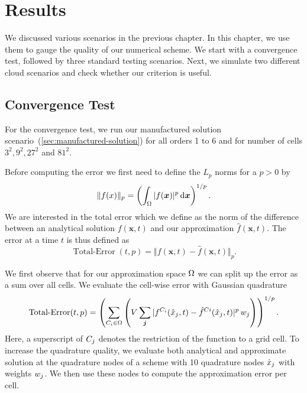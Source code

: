 \chapter{Results}\label{chap:results}
We discussed various scenarios in the previous chapter.
In this chapter, we use them to gauge the quality of our numerical scheme.
We start with a convergence test, followed by three standard testing scenarios.
Next, we simulate two different cloud scenarios and check whether our \amr{} criterion is useful.

\newcommand{\error}{\operatorname{Total-Error}}
\section{Convergence Test}\label{sec:results-convergence}
For the convergence test, we run our manufactured solution scenario~(\cref{sec:manufactured-solution}) for all orders 1 to 6 and for number of cells $3^2, 9^2, 27^2$ and $81^2 $.

Before computing the error we first need to define the $L_p$ norms for a $p > 0$ by
\begin{equation}
  \label{eq:Lp-nrom}
  \Vert f(x) \Vert_p = \left( \intddomain{ \vert f(\bm{x}) \vert^p}  \right)^{1/p}.
\end{equation}
We are interested in the total error which we define as the norm of the difference between an analytical solution $f(\bm{x}, t)$ and our approximation $\hat{f}(\bm{x}, t)$.
The error at a time $t$ is thus defined as
\begin{equation}
  \label{eq:error}
  \error(t,p) = \Vert f(\bm{x}, t) - \hat{f}(\bm{x}, t) \Vert_p.
\end{equation}

We first observe that for our approximation space $\broken$ we can split up the error as a sum over all cells.
We evaluate the cell-wise error with Gaussian quadrature~
 \begin{equation}
   \error(t,p) = 
   \left( \sum_{\cell[i] \in \broken}
    \left( V \sum_{\bm{j}} \vert f^{\cell[i]}(\quadNode[j], t) - \hat{f}^{\cell{i}}(\quadNode[j], t) \vert^p \, \quadWeight[j] \right) \right)^{1/p}.
 \end{equation}
Here, a superscript of $\cell[j]$ denotes the restriction of the function to a grid cell.
To increase the quadrature quality, we evaluate both analytical and approximate solution at the quadrature nodes of a scheme with 10 quadrature nodes $\quadNode[j]$ with weights $\quadWeight[j]$.
We then use these nodes to compute the approximation error per cell.

